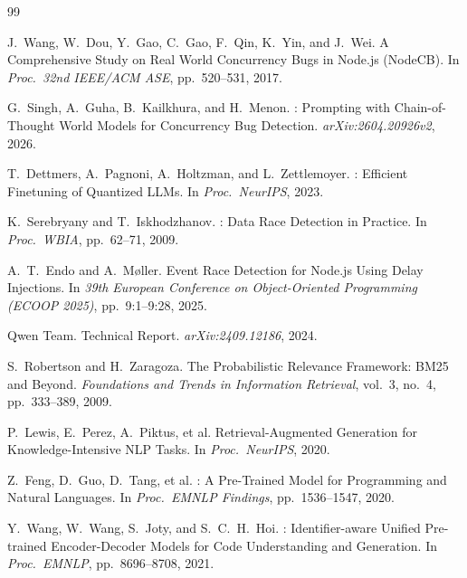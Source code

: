 \documentclass[runningheads]{llncs}
\begin{document}
\begin{thebibliography}{99}

  J.\ Wang, W.\ Dou, Y.\ Gao, C.\ Gao, F.\ Qin, K.\ Yin, and
  J.\ Wei.
  \newblock A Comprehensive Study on Real World Concurrency Bugs in
  {Node.js} ({NodeCB}).
  \newblock In \emph{Proc.\ 32nd IEEE/ACM ASE}, pp.\ 520--531, 2017.

  G.\ Singh, A.\ Guha, B.\ Kailkhura, and H.\ Menon.
  : Prompting with Chain-of-Thought World Models for
  Concurrency Bug Detection.
  \newblock \emph{arXiv:2604.20926v2}, 2026.

  T.\ Dettmers, A.\ Pagnoni, A.\ Holtzman, and L.\ Zettlemoyer.
  : Efficient Finetuning of Quantized LLMs.
  \newblock In \emph{Proc.\ NeurIPS}, 2023.

  K.\ Serebryany and T.\ Iskhodzhanov.
  : Data Race Detection in Practice.
  \newblock In \emph{Proc.\ WBIA}, pp.\ 62--71, 2009.

  A.\ T.\ Endo and A.\ M{\o}ller.
  \newblock Event Race Detection for {Node.js} Using Delay Injections.
  \newblock In \emph{39th European Conference on Object-Oriented Programming (ECOOP 2025)}, pp.\ 9:1--9:28, 2025.

  Qwen Team.
   Technical Report.
  \newblock \emph{arXiv:2409.12186}, 2024.

  S.\ Robertson and H.\ Zaragoza.
  \newblock The Probabilistic Relevance Framework: BM25 and Beyond.
  \newblock \emph{Foundations and Trends in Information Retrieval},
  vol.\ 3, no.\ 4, pp.\ 333--389, 2009.

  P.\ Lewis, E.\ Perez, A.\ Piktus, et al.
  \newblock Retrieval-Augmented Generation for Knowledge-Intensive NLP Tasks.
  \newblock In \emph{Proc.\ NeurIPS}, 2020.

  Z.\ Feng, D.\ Guo, D.\ Tang, et al.
  : A Pre-Trained Model for Programming and Natural Languages.
  \newblock In \emph{Proc.\ EMNLP Findings}, pp.\ 1536--1547, 2020.

  Y.\ Wang, W.\ Wang, S.\ Joty, and S.\ C.\ H.\ Hoi.
  : Identifier-aware Unified Pre-trained Encoder-Decoder
  Models for Code Understanding and Generation.
  \newblock In \emph{Proc.\ EMNLP}, pp.\ 8696--8708, 2021.


\end{thebibliography}
\end{document}
